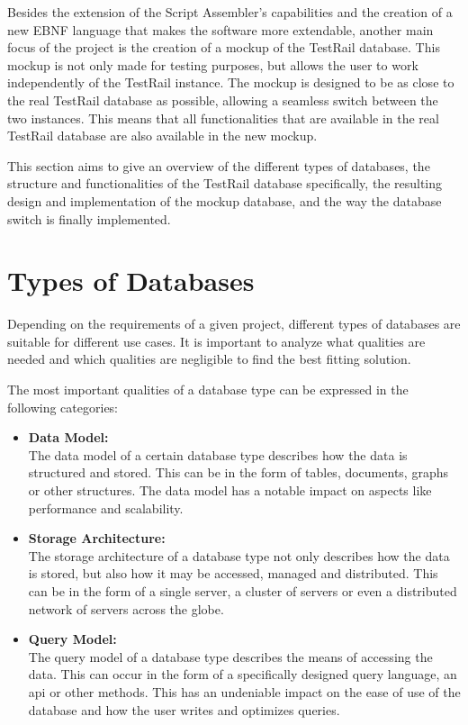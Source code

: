 
Besides the extension of the Script Assembler's capabilities and the creation of a new EBNF language that makes the software more extendable, another main focus of the project is the creation of a mockup of the TestRail database. This mockup is not only made for testing purposes, but allows the user to work independently of the TestRail instance. The mockup is designed to be as close to the real TestRail database as possible, allowing a seamless switch between the two instances. This means that all functionalities that are available in the real TestRail database are also available in the new mockup.

This section aims to give an overview of the different types of databases, the structure and functionalities of the TestRail database specifically, the resulting design and implementation of the mockup database, and the way the database switch is finally implemented.

\section{Types of Databases}

Depending on the requirements of a given project, different types of databases are suitable for different use cases. It is important to analyze what qualities are needed and which qualities are negligible to find the best fitting solution. 

The most important qualities of a database type can be expressed in the following categories:

\begin{itemize}
    \item \textbf{Data Model:} \\
    The data model of a certain database type describes how the data is structured and stored. This can be in the form of tables, documents, graphs or other structures. The data model has a notable impact on aspects like performance and scalability.

    \item \textbf{Storage Architecture:} \\
    The storage architecture of a database type not only describes how the data is stored, but also how it may be accessed, managed and distributed. This can be in the form of a single server, a cluster of servers or even a distributed network of servers across the globe.

    \item \textbf{Query Model:} \\
    The query model of a database type describes the means of accessing the data. This can occur in the form of a specifically designed query language, an \gls{api} or other methods. This has an undeniable impact on the ease of use of the database and how the user writes and optimizes queries.
\end{itemize}

